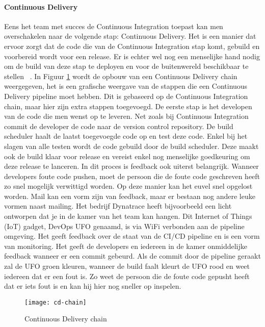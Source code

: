        \paragraph{Continuous Delivery}
        Eens het team met succes de Continuous Integration toepast kan men overschakelen naar de volgende stap: Continuous Delivery.
        Het is een manier dat ervoor zorgt dat de code die van de Continuous Integration stap komt, gebuild en voorbereid wordt voor een release.
        Er is echter wel nog een menselijke hand nodig om de build van deze stap te deployen en voor de buitenwereld beschikbaar te stellen ~\autocite{Fowler2013}.
        \newline{}In Figuur \ref{img-cd-chain} wordt de opbouw van een Continuous Delivery chain weergegeven, het is een grafische weergave van de stappen die een Continuous Delivery pipeline moet hebben. Dit is gebaseerd op de Continuous Integration chain, maar hier zijn extra stappen toegevoegd.
        De eerste stap is het developen van de code die men wenst op te leveren. Net zoals bij Continuous Integration commit de developer de code naar de version control repository. De build scheduler haalt de laatst toegevoegde code op en test deze code. Enkel bij het slagen van alle testen wordt de code gebuild door de build scheduler. Deze maakt ook de build klaar voor release en vereist enkel nog menselijke goedkeuring om deze release te lanceren.
        \newline{}In dit proces is feedback ook uiterst belangrijk. Wanneer developers foute code pushen, moet de persoon die de foute code geschreven heeft zo snel mogelijk verwittigd worden. Op deze manier kan het euvel snel opgelost worden.
        Mail kan een vorm zijn van feedback, maar er bestaan nog andere leuke vormen naast mailing. Het bedrijf Dynatrace heeft bijvoorbeeld een licht ontworpen dat je in de kamer van het team kan hangen. Dit Internet of Things (IoT) gadget, DevOps UFO genaamd, is via WiFi verbonden aan de pipeline omgeving. Het geeft feedback over de staat van de CI/CD pipeline en is een vorm van monitoring. Het geeft de developers en iedereen in de kamer onmiddelijke feedback wanneer er een commit gebeurd. Als de commit door de pipeline geraakt zal de UFO groen kleuren, wanneer de build faalt kleurt de UFO rood en weet iedereen dat er een fout is. Zo weet de persoon die de foute code gepusht heeft dat er iets fout is en kan hij hier nog sneller op inspelen. 
        \begin{figure}	
            \texttt{[image: cd-chain]}
            \caption{Continuous Delivery chain ~\autocite{Riti2018}} \label{img-cd-chain}
        \end{figure}
        
